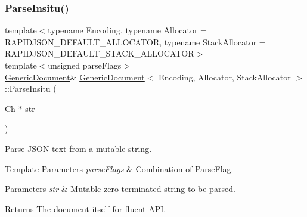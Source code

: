 \mbox{\label{classGenericDocument_a301f8f297a5a0da4b6be5459ad766f75}} 
\subsubsection{\texorpdfstring{Parse\+Insitu()}{ParseInsitu()}\hspace{0.1cm}{\footnotesize\ttfamily [1/2]}}
{\footnotesize\ttfamily template$<$typename Encoding, typename Allocator = R\+A\+P\+I\+D\+J\+S\+O\+N\+\_\+\+D\+E\+F\+A\+U\+L\+T\+\_\+\+A\+L\+L\+O\+C\+A\+T\+OR, typename Stack\+Allocator = R\+A\+P\+I\+D\+J\+S\+O\+N\+\_\+\+D\+E\+F\+A\+U\+L\+T\+\_\+\+S\+T\+A\+C\+K\+\_\+\+A\+L\+L\+O\+C\+A\+T\+OR$>$ \\
template$<$unsigned parse\+Flags$>$ \\
\hyperlink{classGenericDocument}{Generic\+Document}\& \hyperlink{classGenericDocument}{Generic\+Document}$<$ Encoding, Allocator, Stack\+Allocator $>$\+::Parse\+Insitu (\begin{DoxyParamCaption}\item[{\hyperlink{classGenericValue_ade0e0ce64ccd5d852da57a35e720bafb}{Ch} $\ast$}]{str }\end{DoxyParamCaption})\hspace{0.3cm}{\ttfamily [inline]}}



Parse J\+S\+ON text from a mutable string. 


\begin{DoxyTemplParams}{Template Parameters}
{\em parse\+Flags} & Combination of \hyperlink{reader_8h_ab7be7dabe6ffcba60fad441505583450}{Parse\+Flag}. \\
\hline
\end{DoxyTemplParams}

\begin{DoxyParams}{Parameters}
{\em str} & Mutable zero-\/terminated string to be parsed. \\
\hline
\end{DoxyParams}
\begin{DoxyReturn}{Returns}
The document itself for fluent A\+PI. 
\end{DoxyReturn}
\mbox{\label{classGenericDocument_a81922881357539d5482d31aea14b5664}} 

